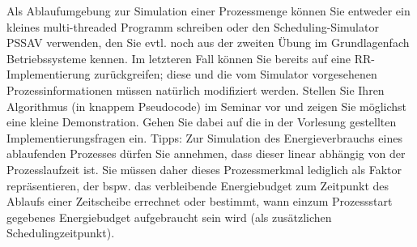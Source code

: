 \documentclass[10pt, a4paper]{exam}
\begin{document}
\begin{questions}
  Als Ablaufumgebung zur Simulation einer Prozessmenge können Sie entweder ein kleines multi-threaded Programm schreiben oder den Scheduling-Simulator PSSAV verwenden, den Sie evtl. noch aus der zweiten Übung im Grundlagenfach Betriebssysteme kennen. Im letzteren Fall können Sie bereits auf eine RR-Implementierung zurückgreifen; diese und die vom Simulator vorgesehenen Prozessinformationen müssen natürlich modifiziert werden.
  Stellen Sie Ihren Algorithmus (in knappem Pseudocode) im Seminar vor und zeigen Sie möglichst eine kleine Demonstration. Gehen Sie dabei auf die in der Vorlesung gestellten Implementierungsfragen ein.
  Tipps: Zur Simulation des Energieverbrauchs eines ablaufenden Prozesses dürfen Sie annehmen, dass dieser linear abhängig von der Prozesslaufzeit ist. Sie müssen daher dieses Prozessmerkmal lediglich als Faktor repräsentieren, der bspw. das verbleibende Energiebudget zum Zeitpunkt des Ablaufs einer Zeitscheibe errechnet oder bestimmt, wann einzum Prozessstart gegebenes Energiebudget aufgebraucht sein wird (als zusätzlichen Schedulingzeitpunkt).


\end{questions}
\end{document}
